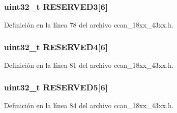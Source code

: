 \subsubsection[{\texorpdfstring{R\+E\+S\+E\+R\+V\+E\+D3}{RESERVED3}}]{ uint32\+\_\+t R\+E\+S\+E\+R\+V\+E\+D3\mbox{[}6\mbox{]}}\hypertarget{struct_l_p_c___c_c_a_n___t_a56ebfb64490f6461d0383a743ee6d8c5}{}\label{struct_l_p_c___c_c_a_n___t_a56ebfb64490f6461d0383a743ee6d8c5}


Definición en la línea 78 del archivo ccan\+\_\+18xx\+\_\+43xx.\+h.

\subsubsection[{\texorpdfstring{R\+E\+S\+E\+R\+V\+E\+D4}{RESERVED4}}]{ uint32\+\_\+t R\+E\+S\+E\+R\+V\+E\+D4\mbox{[}6\mbox{]}}\hypertarget{struct_l_p_c___c_c_a_n___t_a5be6ee872a56ca3d4796d6bb287ec307}{}\label{struct_l_p_c___c_c_a_n___t_a5be6ee872a56ca3d4796d6bb287ec307}


Definición en la línea 81 del archivo ccan\+\_\+18xx\+\_\+43xx.\+h.

\subsubsection[{\texorpdfstring{R\+E\+S\+E\+R\+V\+E\+D5}{RESERVED5}}]{ uint32\+\_\+t R\+E\+S\+E\+R\+V\+E\+D5\mbox{[}6\mbox{]}}\hypertarget{struct_l_p_c___c_c_a_n___t_a0b685e50644e53d4b7c6fa9ed6c93fc8}{}\label{struct_l_p_c___c_c_a_n___t_a0b685e50644e53d4b7c6fa9ed6c93fc8}


Definición en la línea 84 del archivo ccan\+\_\+18xx\+\_\+43xx.\+h.

